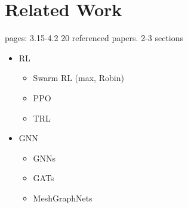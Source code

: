 
\chapter{Related Work}
pages: 3.15-4.2
20 referenced papers. 2-3 sections
\begin{itemize}[noitemsep,nolistsep]
	\item RL
	\begin{itemize}[noitemsep,nolistsep]
        \item Swarm RL (max, Robin)
        \item PPO
        \item TRL
    \end{itemize}
    
	\item GNN
	\begin{itemize}[noitemsep,nolistsep]
        \item GNNs
        \item GATs
        \item MeshGraphNets
    \end{itemize}
\end{itemize}
